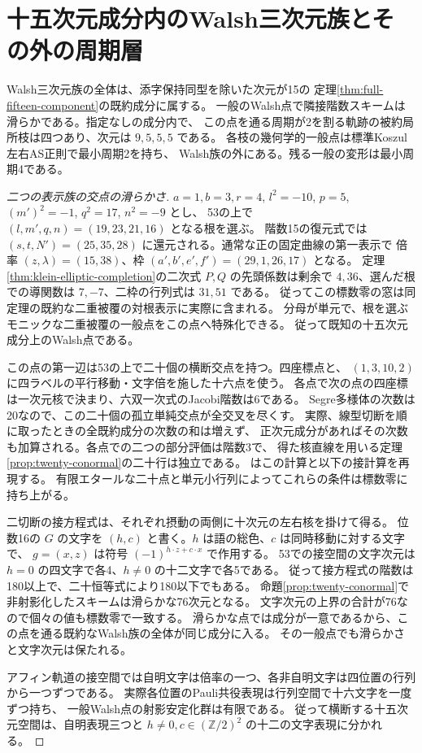 \section{十五次元成分内のWalsh三次元族とその外の周期層}
\label{sec:walsh-full-component}
\begin{theorem}\label{thm:walsh-full-component}
Walsh三次元族の全体は、添字保持同型を除いた次元が15の
定理\ref{thm:full-fifteen-component}の既約成分に属する。
一般のWalsh点で隣接階数スキームは滑らかである。指定なしの成分内で、
この点を通る周期が2を割る軌跡の被約局所枝は四つあり、次元は $9,5,5,5$ である。
各枝の幾何学的一般点は標準Koszul左右AS正則で最小周期2を持ち、
Walsh族の外にある。残る一般の変形は最小周期4である。
\end{theorem}
\begin{proof}[二つの表示族の交点の滑らかさ]
$a=1,b=3,r=4$, $l^2=-10$, $p=5$, $(m')^2=-1$, $q^2=17$, $n^2=-9$ とし、
53の上で $(l,m',q,n)=(19,23,21,16)$ となる根を選ぶ。
階数15の復元式では $(s,t,N')=(25,35,28)$ に還元される。通常な正の固定曲線の第一表示で
倍率 $(z,\lambda)=(15,38)$、枠 $(a',b',e',f')=(29,1,26,17)$ となる。
定理\ref{thm:klein-elliptic-completion}の二次式 $P,Q$ の先頭係数は剰余で
$4,36$、選んだ根での導関数は $7,-7$、二枠の行列式は $31,51$ である。
従ってこの標数零の窓は同定理の既約な二重被覆の対根表示に実際に含まれる。
分母が単元で、根を選ぶモニックな二重被覆の一般点をこの点へ特殊化できる。
従って既知の十五次元成分上のWalsh点である。

この点の第一辺は53の上で二十個の横断交点を持つ。四座標点と、
$(1,3,10,2)$ に四ラベルの平行移動・文字倍を施した十六点を使う。
各点で次の点の四座標は一次元核で決まり、六双一次式のJacobi階数は6である。
Segre多様体の次数は20なので、この二十個の孤立単純交点が全交叉を尽くす。
実際、線型切断を順に取ったときの全既約成分の次数の和は増えず、
正次元成分があればその次数も加算される。各点での二つの部分評価は階数3で、
得た核直線を用いる定理\ref{prop:twenty-conormal}の二十行は独立である。
 はこの計算と以下の接計算を再現する。
有限エタールな二十点と単元小行列によってこれらの条件は標数零に持ち上がる。

二切断の接方程式は、それぞれ摂動の両側に十次元の左右核を掛けて得る。
位数16の $G$ の文字を $(h,c)$ と書く。$h$ は語の総色、$c$ は同時移動に対する文字で、
$g=(x,z)$ は符号 $(-1)^{h\cdot z+c\cdot x}$ で作用する。
53での接空間の文字次元は $h=0$ の四文字で各4、$h\ne0$ の十二文字で各5である。
従って接方程式の階数は180以上で、二十恒等式により180以下でもある。
命題\ref{prop:twenty-conormal}で非射影化したスキームは滑らかな76次元となる。
文字次元の上界の合計が76なので個々の値も標数零で一致する。
滑らかな点では成分が一意であるから、この点を通る既約なWalsh族の全体が同じ成分に入る。
その一般点でも滑らかさと文字次元は保たれる。

アフィン軌道の接空間では自明文字は倍率の一つ、各非自明文字は四位置の行列から一つずつである。
実際各位置のPauli共役表現は行列空間で十六文字を一度ずつ持ち、
一般Walsh点の射影安定化群は有限である。
従って横断する十五次元空間は、自明表現三つと
$h\ne0,c\in(\mathbb Z/2)^2$ の十二の文字表現に分かれる。
\end{proof}

